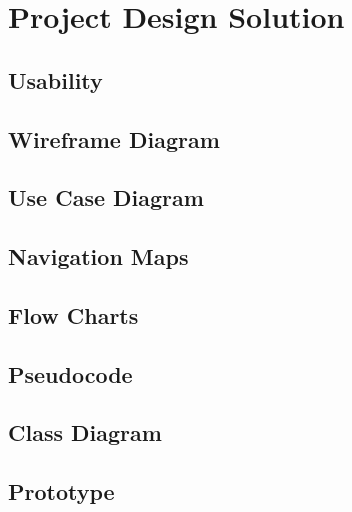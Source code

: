 \chapter{Project Design Solution}
    \section{Usability}
        
        \clearpage
    \section{Wireframe Diagram}
        
        \clearpage
    \section{Use Case Diagram}
        
        \clearpage
    \section{Navigation Maps}
        
        \clearpage
    \section{Flow Charts}
        
        \clearpage
    \section{Pseudocode}
        
        \clearpage
    \section{Class Diagram}
        
        \clearpage
    \section{Prototype}
        
        \clearpage
